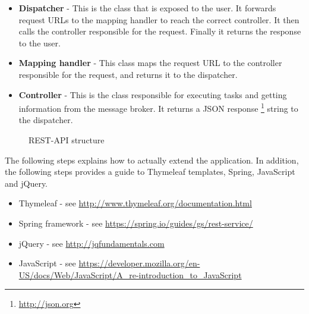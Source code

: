 \begin{itemize}
    \item\textbf{Dispatcher} -  This is the class that is exposed to the user. It forwards request URLs to the mapping handler to reach the correct controller. It then calls the controller responsible for the request. Finally it returns the response to the user. 
    \item\textbf{Mapping handler} - This class maps the request URL to the controller responsible for the request, and returns it to the dispatcher. 
    \item\textbf{Controller} - This is the class responsible for executing tasks and getting information from the message broker. It returns a JSON response \footnote{\url{http://json.org}} string to the dispatcher.  
\end{itemize}

\clearpage

\begin{center}
  \begin{figure}[ht!]
    \caption{REST-API structure}
    \label{fig:spring}
  \end{figure}
\end{center}

The following steps explains how to actually extend the application. In addition, the following steps provides a guide to Thymeleaf templates, Spring, JavaScript and jQuery. 

\begin{itemize}
\setlength{\itemsep}{0cm}%
\item Thymeleaf - see \url{http://www.thymeleaf.org/documentation.html}
\item Spring framework - see \url{https://spring.io/guides/gs/rest-service/}
\item jQuery - see \url{http://jqfundamentals.com}
\item JavaScript - see \url{https://developer.mozilla.org/en-US/docs/Web/JavaScript/A_re-introduction_to_JavaScript}
\end{itemize}

